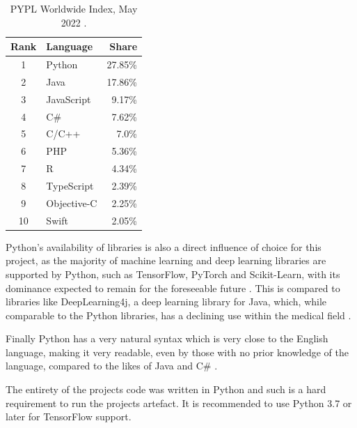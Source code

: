 \begin{table}[H]
    \caption{PYPL Worldwide Index, May 2022 \citep{PYPLPopu3:online}.}
    \centering
    \begin{tabular}{c|l|r}
        Rank & Language & Share \\
        \hline\hline
        1 & Python & 27.85\% \\
        2 & Java & 17.86\% \\
        3 & JavaScript & 9.17\% \\
        4 & C\# & 7.62\% \\
        5 & C/C++ & 7.0\% \\
        6 & PHP & 5.36\% \\
        7 & R & 4.34\% \\
        8 & TypeScript & 2.39\% \\
        9 & Objective-C & 2.25\% \\
        10 & Swift & 2.05\% \\
    \end{tabular}
    \label{tbl:PYPL-table}
\end{table}

Python's availability of libraries is also a direct influence of choice for this project, as the majority of machine learning and deep learning libraries are supported by Python, such as TensorFlow, PyTorch and Scikit-Learn, with its dominance expected to remain for the foreseeable future \citep{raschka2020machine}. This is compared to libraries like DeepLearning4j, a deep learning library for Java, which, while comparable to the Python libraries, has a declining use within the medical field \citep{erickson2017toolkits}. 

Finally Python has a very natural syntax which is very close to the English language, making it very readable, even by those with no prior knowledge of the language, compared to the likes of Java and C\# \citep{srinath2017python}.

The entirety of the projects code was written in Python and such is a hard requirement to run the projects artefact. It is recommended to use Python 3.7 or later for TensorFlow support.

